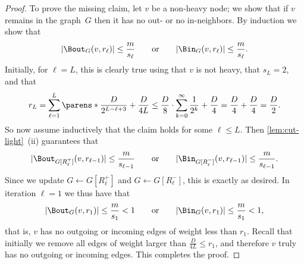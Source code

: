\begin{proof}
To prove the missing claim, let $v$ be a non-heavy node; we show that if $v$ remains in the graph~$G$ then it has no out- or no in-neighbors. By induction we show that
\begin{equation*}
    |\Bout_G(v, r_\ell)| \leq \frac{m}{s_\ell} \qquad\text{or}\qquad |\Bin_G(v, r_\ell)| \leq \frac{m}{s_\ell}.
\end{equation*}
Initially, for $\ell = L$, this is clearly true using that $v$ is not heavy, that $s_L = 2$, and that
\begin{equation*}
    r_L = \sum_{\ell=1}^L \parens*{\frac{D}{2^{L-\ell+3}} + \frac{D}{4L}} \leq \frac{D}{8} \cdot \sum_{k=0}^\infty \frac{1}{2^k} + \frac{D}{4} = \frac{D}{4} + \frac{D}{4} = \frac{D}{2}.
\end{equation*}
So now assume inductively that the claim holds for some $\ell \leq L$. Then \cref{lem:cut-light}~(ii) guarantees that
\begin{equation*}
    |\Bout_{G[R^+_\ell]}(v, r_{\ell-1})| \leq \frac{m}{s_{\ell-1}} \qquad\text{or}\qquad |\Bin_{G[R^-_\ell]}(v, r_{\ell-1})| \leq \frac{m}{s_{\ell-1}}.
\end{equation*}
Since we update $G \gets G[R^+_\ell]$ and $G \gets G[R^-_\ell]$, this is exactly as desired. In iteration $\ell = 1$ we thus have that 
\begin{equation*}
    |\Bout_G(v, r_1)| \leq \frac{m}{s_1} < 1 \qquad\text{or}\qquad |\Bin_G(v, r_1)| \leq \frac{m}{s_1} < 1,
\end{equation*}
that is, $v$ has no outgoing or incoming edges of weight less than $r_1$. Recall that initially we remove all edges of weight larger than $\frac{D}{4L} \leq r_1$, and therefore $v$ truly has no outgoing or incoming edges. This completes the proof.
\end{proof}

